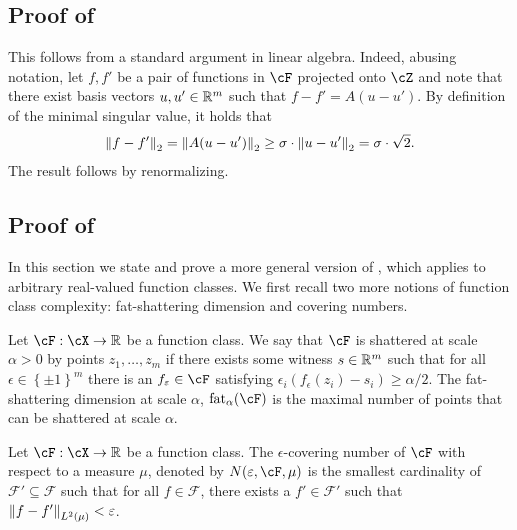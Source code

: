 

\subsection{Proof of }\label{app:singular_value}

This follows from a standard argument in linear algebra.  Indeed, abusing notation, let $f, f'$ be a pair of functions in $\cF$ projected onto $\cZ$ and note that there exist basis vectors $u, u' \in \mathbb{R}^{m}$ such that $f -f' = A (u - u')$.  By definition of the minimal singular value, it holds that
\begin{align}
    \left\|f -f'\right\|_2 = \left\|A (u - u')\right\|_2 \geq \sigma \cdot \left\|u - u'\right\|_2 = \sigma \cdot \sqrt{2}.
\end{align} 
The result follows by renormalizing.







\subsection{Proof of } 
\label{sec:separator_proofs} 

    
    In this section we state and prove a more general version of , which applies to arbitrary real-valued function classes.  We first recall two more notions of function class complexity: fat-shattering dimension \citep{bartlett1994fat} and covering numbers.
    \begin{definition}
        Let $\cF: \cX \to \rr$ be a function class.  We say that $\cF$ is shattered at scale $\alpha > 0$ by points $z_1, \dots, z_m$ if there exists some witness $s \in \mathbb{R}^m$ such that for all $\epsilon \in \left\{ \pm 1 \right\}^m$ there is an $f_\epsilon \in \cF$ satisfying $\epsilon_i (f_\epsilon(z_i) - s_i) \geq \alpha / 2$.  The fat-shattering dimension at scale $\alpha$, $\fat_\alpha(\cF)$ is the maximal number of points that can be shattered at scale $\alpha$.
    \end{definition}

    \begin{definition}
        Let $\cF: \cX \to \rr$ be a function class.  The $\epsilon$-covering number of $\cF$ with respect to a measure $\mu$, denoted by $N(\epsilon, \cF, \mu)$ is the smallest cardinality of $\mathcal{F'} \subseteq \mathcal{F} $ such that for all $f \in \mathcal{F}$, there exists a $f' \in \mathcal{F}' $ such that $ \left\| f - f' \right\|_{L^2(\mu)} <  \varepsilon $.
    \end{definition}


